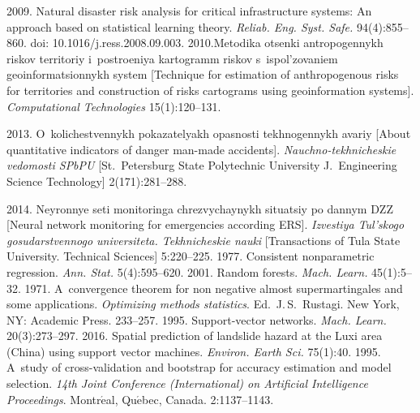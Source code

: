   \begin{multicols}{2}

\renewcommand{\bibname}{\protect\rmfamily References}

{\small\frenchspacing
 {%
 \begin{thebibliography}{99}
  

 2009. Natural disaster risk analysis for critical infrastructure 
systems: An approach based on statistical learning theory. \textit{Reliab.
Eng. Syst. Safe.} 94(4):855--860. doi: 10.1016/j.ress.2008.09.003.
 2010.Metodika otsenki 
antropogennykh riskov territoriy i~postroeniya kartogramm riskov s~ispol'zovaniem 
geoinformatsionnykh system [Technique for estimation of anthropogenous risks for 
territories and construction of risks cartograms using geoinformation systems]. 
\textit{Computational Technologies} 15(1):120--131.

 2013. 
O~kolichestvennykh pokazatelyakh opasnosti tekhnogennykh avariy [About 
quantitative indicators of danger man-made accidents]. 
\textit{Nauchno-tekhnicheskie vedomosti SPbPU} [St.\ Petersburg State
Polytechnic University 
J.~Engineering Science Technology] 2(171):281--288. 

 2014. Neyronnye 
seti monitoringa chrezvychaynykh situatsiy po dannym DZZ  [Neural network 
monitoring for emergencies according ERS]. \textit{Izvestiya 
Tul'skogo gosudarstvennogo universiteta. Tekhnicheskie nauki} [Transactions of 
Tula State University. Technical Sciences] 5:220--225.
 1977. Consistent nonparametric regression. \textit{Ann.
Stat.} 5(4):595--620.
 2001. Random forests. \textit{Mach. Learn.} 45(1):5--32.
 1971. A~convergence theorem for non 
negative almost supermartingales and some applications. \textit{Optimizing methods 
statistics}. Ed.\ J.\,S.~Rustagi.
New York, NY: Academic Press. 233--257.
 1995. Support-vector networks. \textit{Mach. 
Learn.} 20(3):273--297.
 2016. Spatial prediction of 
landslide hazard at the Luxi area (China) using support vector machines. 
\textit{Environ. Earth Sci.} 75(1):40.
 1995. A~study of cross-validation and bootstrap for accuracy 
estimation and model selection. \textit{14th  Joint Conference (International) on 
Artificial Intelligence Proceedings}. Montr$\acute{\mbox{e}}$al, 
Qu$\acute{\mbox{e}}$bec, Canada.  2:1137--1143. 
 \end{thebibliography}

 }
 }

\end{multicols}

